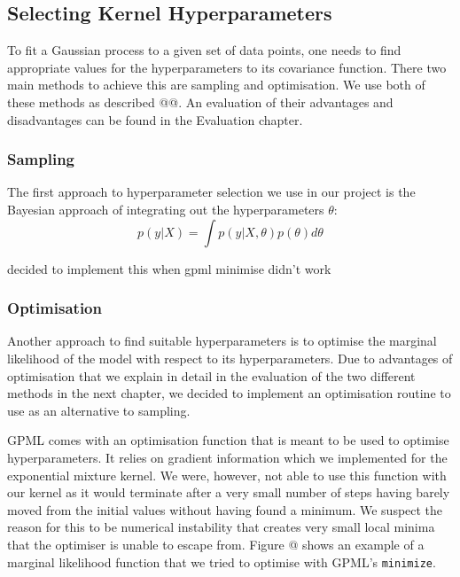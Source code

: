\documentclass[a4paper,12pt,twoside,openright]{report}
\begin{document}
\subsection{Selecting Kernel Hyperparameters}
To fit a Gaussian process to a given set of data points, one needs to find appropriate values for the hyperparameters to its covariance function. There two main methods to achieve this are sampling and optimisation. We use both of these methods as described @@. An evaluation of their advantages and disadvantages can be found in the Evaluation chapter.

\subsubsection{Sampling}
The first approach to hyperparameter selection we use in our project is the Bayesian approach of integrating out the hyperparameters $\theta$:
\begin{equation}
p(y|X) = \int p(y|X,\theta)p(\theta)d\theta
\end{equation}



decided to implement this when gpml minimise didn't work






\subsubsection{Optimisation}
Another approach to find suitable hyperparameters is to optimise the marginal likelihood of the model with respect to its hyperparameters. Due to advantages of optimisation that we explain in detail in the evaluation of the two different methods in the next chapter, we decided to implement an optimisation routine to use as an alternative to sampling.

GPML comes with an optimisation function that is meant to be used to optimise hyperparameters. It relies on gradient information which we implemented for the exponential mixture kernel. We were, however, not able to use this function with our kernel as it would terminate after a very small number of steps having barely moved from the initial values without having found a minimum. We suspect the reason for this to be numerical instability that creates very small local minima that the optimiser is unable to escape from. Figure @ shows an example of a marginal likelihood function that we tried to optimise with GPML's \texttt{minimize}. 
\end{document}
